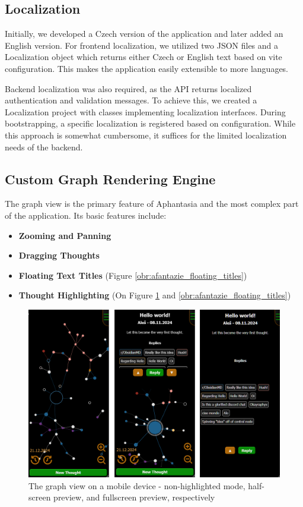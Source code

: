 \subsection{Localization}
Initially, we developed a Czech version of the application and later added an English version.
For frontend \gls{localization}, we utilized two JSON files and a Localization object which returns 
either Czech or English text based on \gls{vite} configuration.
This makes the application easily extensible to more languages.

Backend localization was also required, as the API returns localized authentication and validation messages.
To achieve this, we created a Localization project with classes implementing localization interfaces.
During bootstrapping, a specific localization is registered based on configuration. 
While this approach is somewhat cumbersome, it suffices for the limited localization needs of the backend.

\subsection{Custom Graph Rendering Engine}

The graph view is the primary feature of Aphantasia and the most complex part of the application.
Its basic features include:
\begin{itemize}
\item \textbf{Zooming and Panning}
\item \textbf{Dragging Thoughts}
\item \textbf{Floating Text Titles} (Figure \ref{obr:afantazie_floating_titles})
\item \textbf{Thought Highlighting} (On Figure \ref{obr:afantazie_mobile_graph_view} and \ref{obr:afantazie_floating_titles})
\end{itemize}

\begin{figure}[p]
    \includegraphics[width=130mm, keepaspectratio]{img/afantazie_mobile_graph_view.png}
    \caption{The graph view on a mobile device - non-highlighted mode, half-screen preview, and fullscreen preview, respectively}
    \label{obr:afantazie_mobile_graph_view}
\end{figure}

